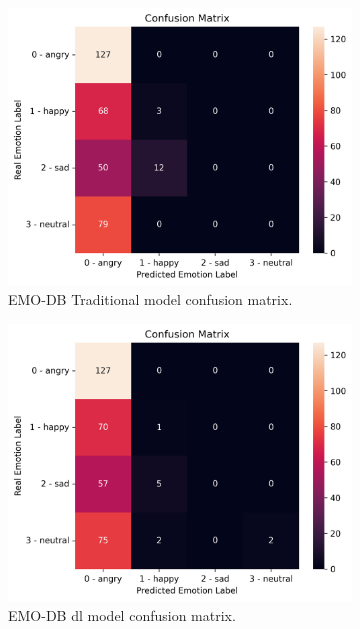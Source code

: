 \begin{figure}
	\begin{subfigure}{.5\textwidth}
		\centering
		\includegraphics[width=\linewidth]{figs/4_5_discussion/emo_trad_cm.png}
		\caption{EMO-DB Traditional model confusion matrix.}
	\end{subfigure}%
	\begin{subfigure}{.5\textwidth}
		\centering
		\includegraphics[width=\linewidth]{figs/4_5_discussion/emo_deep_cm.png}
		\caption{EMO-DB \ac{dl} model confusion matrix.}
	\end{subfigure}
	\newline
	\begin{subfigure}{.5\textwidth}

\end{subfigure}
\end{figure}
